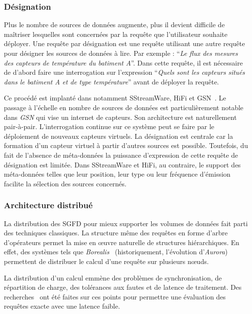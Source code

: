 \subsubsection{Désignation}\label{sec:rw:sgfd:infra:designation}
Plus le nombre de sources de données augmente, plus il devient difficile de maîtriser lesquelles sont concernées par la requête que l'utilisateur souhaite déployer. Une requête par désignation est une requête utilisant une autre requête pour désigner les sources de données à lire. Par exemple : \enquote{\it Le flux des mesures des capteurs de température du batiment A}. Dans cette requête, il est nécessaire de d'abord faire une interrogation sur l'expression \enquote{\it Quels sont les capteurs situés dans le batiment \textit{A} et de type \textit{température}} avant de déployer la requête.

Ce procédé est implanté dans notamment SStreamWare, HiFi et GSN~\cite{Aberer:gsn}. Le passage à l'échelle en nombre de sources de données est particulièrement notable dans \textit{GSN} qui vise un internet de capteurs. Son architecture est naturellement pair-à-pair. L’interrogation continue sur ce système peut se faire par le déploiement de nouveaux capteurs virtuels. La désignation est centrale car la formation d’un capteur virtuel à partir d’autres sources est possible. Toutefois, du fait de l’absence de méta-données la puissance d'expression de cette requête de désignation est limitée. Dans SStreamWare et HiFi, au contraire, le support des méta-données telles que leur position, leur type ou leur fréquence d'émission facilite la sélection des sources concernés.

\subsubsection{Architecture distribué}
La distribution des SGFD pour mieux supporter les volumes de données fait parti des techniques classiques. La structure même des requêtes en forme d'arbre d'opérateurs permet la mise en œuvre naturelle de structures hiérarchiques. En effet, des systèmes tels que \textit{Borealis}~\cite{Abadi:borealis} (historiquement, l'évolution d'\textit{Aurora}) permettent de distribuer le calcul d'une requête sur plusieurs nœuds.

La distribution d'un calcul emmène des problèmes de synchronisation, de répartition de charge, des tolérances aux fautes et de latence de traitement. Des recherches~\cite{Hwang:distributed, Tucker:heartbeat} ont été faites sur ces points pour permettre une évaluation des requêtes exacte avec une latence faible.

